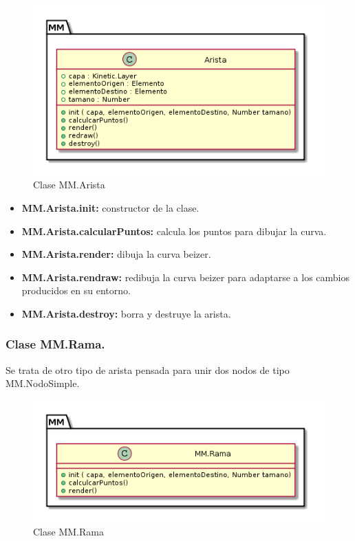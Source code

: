 \begin{figure}[tbph]
\centering
\includegraphics[width=0.7\linewidth]{imagenes/diagrama-clase-mm-arista}
\caption{Clase MM.Arista}
\label{fig:diagrama-clase-mm-arista}
\end{figure}

\begin{itemize}
\item \textbf{MM.Arista.init:} constructor de la clase.
\item \textbf{MM.Arista.calcularPuntos:} calcula los puntos para dibujar la curva.
\item \textbf{MM.Arista.render:} dibuja la curva beizer.
\item \textbf{MM.Arista.rendraw:} redibuja la curva beizer para adaptarse a los cambios producidos en su entorno.
\item \textbf{MM.Arista.destroy:} borra y destruye la arista.
\end{itemize}


\subsubsection{Clase MM.Rama.}
Se trata de otro tipo de arista pensada para unir dos nodos de tipo MM.NodoSimple.

\begin{figure}[tbph]
\centering
\includegraphics[width=0.7\linewidth]{imagenes/diagrama-clase-mm-rama}
\caption{Clase MM.Rama}
\label{fig:diagrama-clase-mm-rama}
\end{figure}



